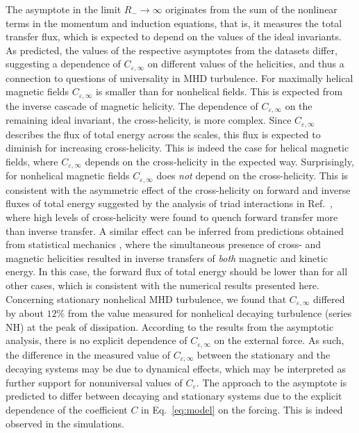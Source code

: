 \documentclass[aps,pre,onecolumn,superscriptaddress,notitlepage]{revtex4-1}
\newcommand{\Ceps}{C_\varepsilon}
\newcommand{\Cinf}{C_{\varepsilon,\infty}}
\begin{document}
The asymptote in the limit $R_{-} \to \infty$ originates from the sum of the nonlinear terms
in the momentum and induction equations, that is, it measures the total transfer flux, which 
is expected to depend on the values of the ideal invariants.
As predicted, the values of the respective asymptotes from the datasets differ,
suggesting a dependence of $\Cinf$ on different values of the helicities,
and thus a connection to questions of universality in MHD turbulence.
For maximally helical magnetic fields $\Cinf$ is smaller than for nonhelical fields. This is expected
from the inverse cascade of magnetic helicity. The dependence of $\Cinf$ on the remaining
ideal invariant, the cross-helicity, is more complex. Since $\Cinf$ describes the 
flux of total energy across the scales, this flux is expected to diminish for increasing 
cross-helicity. This is indeed the case for helical magnetic fields, where 
$\Cinf$ depends on the cross-helicity in the expected way. Surprisingly, for nonhelical 
magnetic fields $\Cinf$ does {\em not} depend on the cross-helicity. 
This is consistent with the asymmetric effect of 
the cross-helicity on forward and inverse fluxes of total energy  
suggested by the analysis of triad interactions in Ref.~\cite{Linkmann16a}, 
where high levels of cross-helicity were found to quench 
forward transfer more than inverse transfer. A similar effect can be inferred from 
predictions obtained from statistical mechanics \cite{Frisch75}, where the simultaneous 
presence of cross- and magnetic helicities resulted in inverse transfers of {\em both}
magnetic and kinetic energy. In this case, the forward flux of total energy should be 
lower than for all other cases, which is consistent with the numerical results presented here.     
%
Concerning stationary nonhelical MHD turbulence, we found that $\Cinf$ differed by about $12 \%$ 
from the value measured for nonhelical decaying turbulence (series NH) at the peak of dissipation. 
According to the results from the asymptotic analysis, there is no explicit dependence of $\Cinf$ on 
the external force. As such, the difference in the measured value of $\Cinf$ between the stationary and the 
decaying systems may be due to dynamical effects, which may be interpreted as further support for 
nonuniversal values of $\Ceps$. The approach to the asymptote is predicted to differ between 
decaying and stationary systems due to the explicit dependence of the coefficient $C$ in 
Eq.~\eqref{eq:model} on the forcing. This is indeed observed in the simulations. 
 
\end{document}
